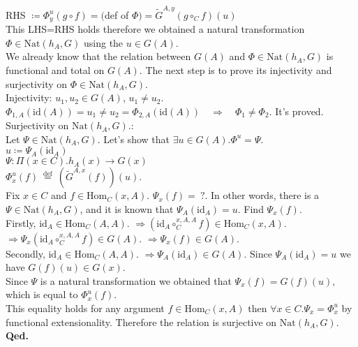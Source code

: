 \documentclass[10pt,a4paper]{article}
\theoremstyle{definition}
\newcommand{\Hom}{{\textrm{Hom}}}
\newcommand{\Nat}{{\textrm{Nat}}}
\newcommand{\GMor}{{\widetilde{G}\textrm{}}}
\newcommand{\id}{{\textrm{id}}}
\newcommand{\defi}{{\textrm{def}}}
\newcommand{\eqdef}{{\ \stackrel{\defi}{=}\ }}
\newcommand{\myqed}{\noindent\textbf{Qed.}}
\begin{document}
RHS $\coloneqq \Phi^u_y(g\circ f)=($def of $\Phi)=\GMor^{A,y}\left(g\circ_C f\right)(u)$\\
This LHS=RHS holds therefore we obtained a natural transformation $\Phi\in\Nat(h_A,G)$ using the $u\in G(A)$.\\
We already know that the relation between $G(A)$ and $\Phi\in\Nat(h_A,G)$ is functional and total on $G(A)$.
The next step is to prove its injectivity and surjectivity on $\Phi\in\Nat(h_A,G)$.\\
Injectivity: $u_1,u_2\in G(A)$, $u_1\neq u_2$.\\
$\Phi_{1,A}(\id(A))= u_1\neq u_2 = \Phi_{2,A}(\id(A))\quad \Longrightarrow \quad \Phi_1 \neq \Phi_2$. It's proved. \\
Surjectivity on $\Nat(h_A,G)$.:\\
Let $\Psi\in\Nat(h_A,G)$. Let's show that $\exists u\in G(A).\Phi^u=\Psi$.\\
$u\coloneqq \Psi_A(\id_A)$\\
$\Psi:\Pi(x\in C). h_A(x)\to G(x)$\\
$\Phi^u_x(f) \eqdef (\GMor^{A,x}(f))(u)$.\\
Fix $x\in C$ and $f\in\Hom_C(x,A)$. $\Psi_x(f)=\ ?$.
In other words, there is a $\Psi\in\Nat(h_A,G)$, and it is known that $\Psi_A(\id_A) = u$. Find $\Psi_x(f)$.\\
Firstly, $\id_A \in \Hom_C(A,A)$. $\Longrightarrow (\id_A \circ_C^{x,A,A} f) \in \Hom_C(x,A)$. $\Longrightarrow \Psi_x(\id_A \circ_C^{x,A,A} f)\in G(A)$. $\Longrightarrow \Psi_x(f)\in G(A)$.\\
Secondly, $\id_A \in \Hom_C(A,A)$. $\Longrightarrow \Psi_A(\id_A) \in G(A)$. Since $\Psi_A(\id_A)=u$ we have $G(f)(u)\in G(x)$.\\
Since $\Psi$ is a natural transformation we obtained that $\Psi_x(f)=G(f)(u),$ which is equal to $\Phi^u_x(f)$.\\
This equality holds for any argument $f\in \Hom_C(x,A)$ then $\forall x\in C. \Psi_x=\Phi^u_x$ by functional extensionality. Therefore the relation is surjective on $\Nat(h_A,G)$.
\myqed\\
\end{document}

